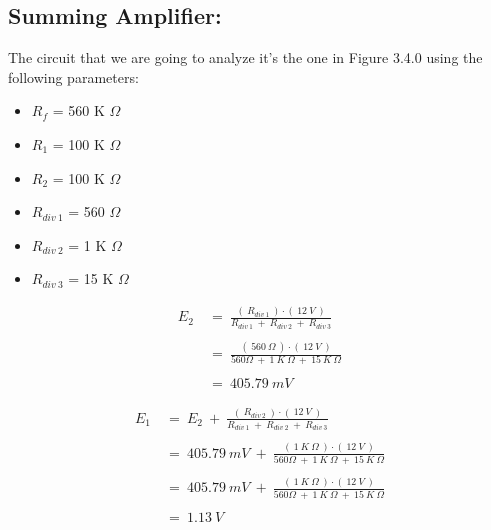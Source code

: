 \subsection{Summing Amplifier:}

The circuit that we are going to analyze it's the one in Figure 3.4.0 using the following parameters: \hfill \break

{\bfseries
\begin{itemize}
\item $R_{f}$ = 560 K $\Omega$
\item $R_{1}$ = 100 K $\Omega$
\item $R_{2}$ = 100 K $\Omega$
\item $R_{div\ 1}$ = 560 $\Omega$
\item $R_{div\ 2}$ = 1 K $\Omega$
\item $R_{div\ 3}$ = 15 K $\Omega$
\end{itemize}} \hfill

{\bfseries\itshape{}} 

\begin{flushright}
{\bfseries\itshape{}} \hfill \break
\end{flushright}

\begin{ceqn}
\begin{align*}
E_{2}\ &=\ \frac{(\ R_{div\ 1}\ ) \cdot (\ 12\ V\ )}{R_{div\ 1}\ +\ R_{div\ 2}\ +\ R_{div\ 3}} \\ \\
&=\ \frac{(\ 560\ \Omega\ ) \cdot (\ 12\ V\ )}{560 \Omega\ +\ 1\ K\ \Omega\ +\ 15\ K\ \Omega} \\ \\
&=\ 405.79\ mV
\end{align*}
\end{ceqn} \hfill \break

{\bfseries\itshape{}} 

\begin{ceqn}
\begin{align*}
E_{1}\ &=\ E_{2}\ +\ \frac{(\ R_{div\ 2}\ ) \cdot (\ 12\ V\ )}{R_{div\ 1}\ +\ R_{div\ 2}\ +\ R_{div\ 3}} \\ \\
&=\ 405.79\ mV\ +\ \frac{(\ 1\ K\ \Omega\ ) \cdot (\ 12\ V\ )}{560 \Omega\ +\ 1\ K\ \Omega\ +\ 15\ K\ \Omega} \\ \\
&=\ 405.79\ mV\ +\ \frac{(\ 1\ K\ \Omega\ ) \cdot (\ 12\ V\ )}{560 \Omega\ +\ 1\ K\ \Omega\ +\ 15\ K\ \Omega} \\ \\
&=\ 1.13\ V
\end{align*}
\end{ceqn} \hfill \break

